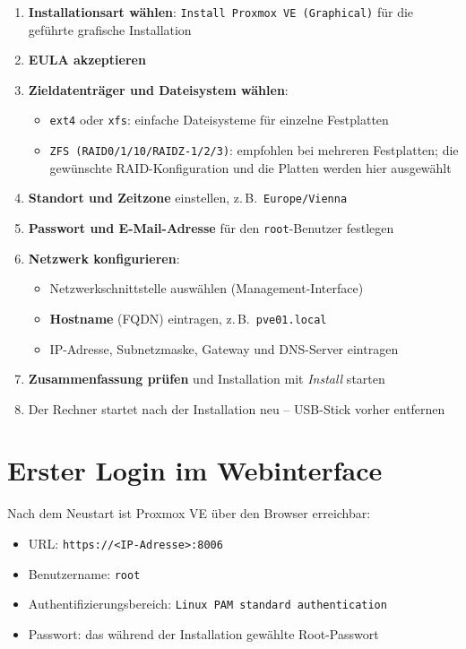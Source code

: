 \documentclass[11pt, oneside, numbers=noenddot]{scrbook}
\begin{document}
\begin{enumerate}
  \item \textbf{Installationsart wählen}: \texttt{Install Proxmox VE (Graphical)} für die geführte grafische Installation
  \item \textbf{EULA akzeptieren}
  \item \textbf{Zieldatenträger und Dateisystem wählen}:
    \begin{itemize}
      \item \texttt{ext4} oder \texttt{xfs}: einfache Dateisysteme für einzelne Festplatten
      \item \texttt{ZFS (RAID0/1/10/RAIDZ-1/2/3)}: empfohlen bei mehreren Festplatten; die gewünschte RAID-Konfiguration und die Platten werden hier ausgewählt
    \end{itemize}
  \item \textbf{Standort und Zeitzone} einstellen, z.\,B.\ \texttt{Europe/Vienna}
  \item \textbf{Passwort und E-Mail-Adresse} für den \texttt{root}-Benutzer festlegen
  \item \textbf{Netzwerk konfigurieren}:
    \begin{itemize}
      \item Netzwerkschnittstelle auswählen (Management-Interface)
      \item \textbf{Hostname} (FQDN) eintragen, z.\,B.\ \texttt{pve01.local}
      \item IP-Adresse, Subnetzmaske, Gateway und DNS-Server eintragen
    \end{itemize}
  \item \textbf{Zusammenfassung prüfen} und Installation mit \textit{Install} starten
  \item Der Rechner startet nach der Installation neu -- USB-Stick vorher entfernen
\end{enumerate}

\section{Erster Login im Webinterface}
Nach dem Neustart ist Proxmox VE über den Browser erreichbar:
\begin{itemize}
  \item URL: \texttt{https://<IP-Adresse>:8006}
  \item Benutzername: \texttt{root}
  \item Authentifizierungsbereich: \texttt{Linux PAM standard authentication}
  \item Passwort: das während der Installation gewählte Root-Passwort
\end{itemize}
\end{document}
